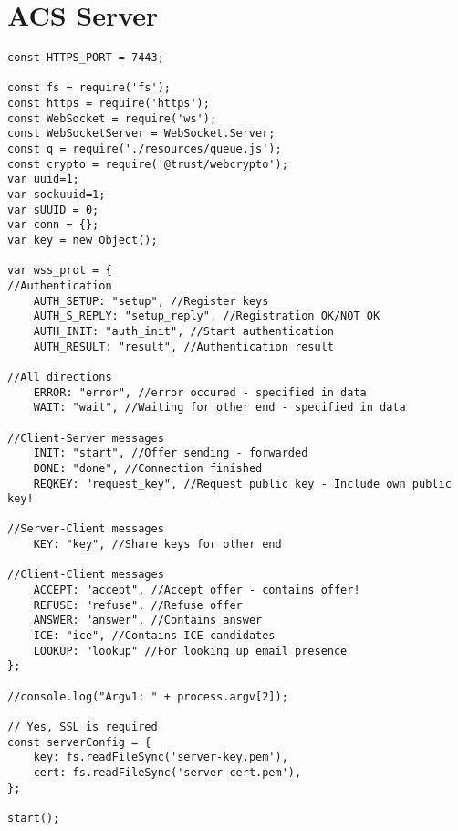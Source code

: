 
\chapter{ACS Server} %

\label{AppendixA} %

\begin{lstlisting}[caption=ACS Server, style=htmlcssjs]
const HTTPS_PORT = 7443;

const fs = require('fs');
const https = require('https');
const WebSocket = require('ws');
const WebSocketServer = WebSocket.Server;
const q = require('./resources/queue.js');
const crypto = require('@trust/webcrypto');
var uuid=1;
var sockuuid=1;
var sUUID = 0;
var conn = {};
var key = new Object();

var wss_prot = {
//Authentication	
	AUTH_SETUP: "setup", //Register keys
	AUTH_S_REPLY: "setup_reply", //Registration OK/NOT OK
	AUTH_INIT: "auth_init", //Start authentication
	AUTH_RESULT: "result", //Authentication result

//All directions
	ERROR: "error", //error occured - specified in data
	WAIT: "wait", //Waiting for other end - specified in data

//Client-Server messages
	INIT: "start", //Offer sending - forwarded
	DONE: "done", //Connection finished
	REQKEY: "request_key", //Request public key - Include own public key!

//Server-Client messages
	KEY: "key", //Share keys for other end

//Client-Client messages
	ACCEPT: "accept", //Accept offer - contains offer!
	REFUSE: "refuse", //Refuse offer
	ANSWER: "answer", //Contains answer
	ICE: "ice", //Contains ICE-candidates
	LOOKUP: "lookup" //For looking up email presence
};

//console.log("Argv1: " + process.argv[2]);

// Yes, SSL is required
const serverConfig = {
    key: fs.readFileSync('server-key.pem'),
    cert: fs.readFileSync('server-cert.pem'),
};

start();


\end{lstlisting}
